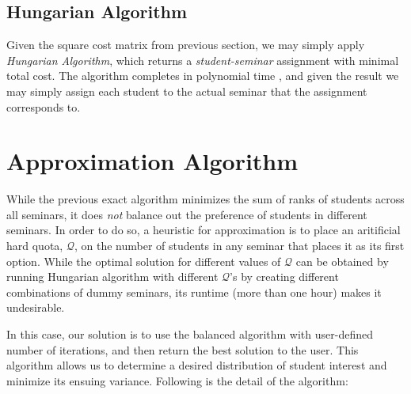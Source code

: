 \documentclass{article} %
\begin{document}
\subsection{Hungarian Algorithm}
    \par\qquad Given the square cost matrix from previous section, we may simply apply \emph{Hungarian Algorithm}, which returns a \emph{student-seminar} assignment with minimal total cost. The algorithm completes in polynomial time \cite{mt90}, and given the result we may simply assign each student to the actual seminar that the assignment corresponds to.

%
%
\section{Approximation Algorithm}
    \par\qquad While the previous exact algorithm minimizes the sum of ranks of students across all seminars, it does \emph{not} balance out the preference of students in different seminars. In order to do so, a heuristic for approximation is to place an aritificial hard quota, $\mathcal{Q}$, on the number of students in any seminar that places it as its first option. While the optimal solution for different values of $\mathcal{Q}$ can be obtained by running Hungarian algorithm with different $\mathcal{Q}$'s by creating different combinations of dummy seminars, its runtime (more than one hour) makes it undesirable.
    \par\qquad In this case, our solution is to use the balanced algorithm with user-defined number of iterations, and then return the best solution to the user. This algorithm allows us to determine a desired distribution of student interest and minimize its ensuing variance. Following is the detail of the algorithm:
\end{document}
